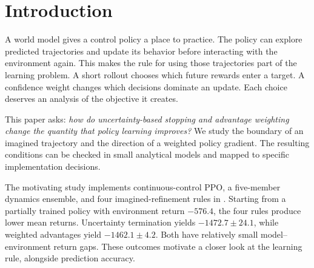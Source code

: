\begin{abstract}
Uncertainty controls determine how an agent learns inside a world model. Ending a rollout assigns a value to its boundary. Weighting an advantage changes how individual decisions contribute to the policy update. We analyze these two choices directly. For stopped trajectories, we derive the exact boundary-value error and characterize when a constant reward shift preserves policy rankings. For a finite-action decision state, we characterize when fixed positive weights produce nonnegative alignment with the return gradient for every exact centered advantage. The characterization separates compatibility with the policy's score space from the geometry used to update its parameters. Fisher preconditioning resolves the geometric obstruction when the compatibility condition holds. Explicit finite-action and Gaussian examples show how positive weights can reverse the return gradient. An existing Pendulum study provides a continuous-control setting: four imagined-refinement rules reduce mean environment return from a weaker starting policy, and uncertainty-aware rules have small return gaps alongside poor control. The analysis gives concrete conditions for choosing rollout boundaries and weighting rules while keeping the intended learning objective in view.
\end{abstract}

\section{Introduction}

A world model gives a control policy a place to practice. The policy can explore predicted trajectories and update its behavior before interacting with the environment again. This makes the rule for using those trajectories part of the learning problem. A short rollout chooses which future rewards enter a target. A confidence weight changes which decisions dominate an update. Each choice deserves an analysis of the objective it creates.

This paper asks: \emph{how do uncertainty-based stopping and advantage weighting change the quantity that policy learning improves?} We study the boundary of an imagined trajectory and the direction of a weighted policy gradient. The resulting conditions can be checked in small analytical models and mapped to specific implementation decisions.

The motivating study implements continuous-control PPO, a five-member dynamics ensemble, and four imagined-refinement rules in . Starting from a partially trained policy with environment return $-576.4$, the four rules produce lower mean returns. Uncertainty termination yields $-1472.7\pm24.1$, while weighted advantages yield $-1462.1\pm4.2$. Both have relatively small model--environment return gaps. These outcomes motivate a closer look at the learning rule, alongside prediction accuracy.

